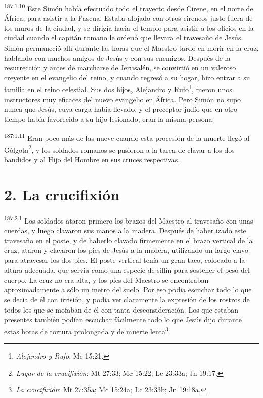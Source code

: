 \par 
\textsuperscript{187:1.10} Este Simón había efectuado todo el trayecto desde Cirene, en el norte de África, para asistir a la Pascua. Estaba alojado con otros cireneos justo fuera de los muros de la ciudad, y se dirigía hacia el templo para asistir a los oficios en la ciudad cuando el capitán romano le ordenó que llevara el travesaño de Jesús. Simón permaneció allí durante las horas que el Maestro tardó en morir en la cruz, hablando con muchos amigos de Jesús y con sus enemigos. Después de la resurrección y antes de marcharse de Jerusalén, se convirtió en un valeroso creyente en el evangelio del reino, y cuando regresó a su hogar, hizo entrar a su familia en el reino celestial. Sus dos hijos, Alejandro y Rufo\footnote{\textit{Alejandro y Rufo}: Mc 15:21.}, fueron unos instructores muy eficaces del nuevo evangelio en África. Pero Simón no supo nunca que Jesús, cuya carga había llevado, y el preceptor judío que en otro tiempo había favorecido a su hijo lesionado, eran la misma persona.

\par 
\textsuperscript{187:1.11} Eran poco más de las nueve cuando esta procesión de la muerte llegó al Gólgota\footnote{\textit{Lugar de la crucifixión}: Mt 27:33; Mc 15:22; Lc 23:33a; Jn 19:17.}, y los soldados romanos se pusieron a la tarea de clavar a los dos bandidos y al Hijo del Hombre en sus cruces respectivas.

\section*{2. La crucifixión}
\par 
\textsuperscript{187:2.1} Los soldados ataron primero los brazos del Maestro al travesaño con unas cuerdas, y luego clavaron sus manos a la madera. Después de haber izado este travesaño en el poste, y de haberlo clavado firmemente en el brazo vertical de la cruz, ataron y clavaron los pies de Jesús a la madera, utilizando un largo clavo para atravesar los dos pies. El poste vertical tenía un gran taco, colocado a la altura adecuada, que servía como una especie de sillín para sostener el peso del cuerpo. La cruz no era alta, y los pies del Maestro se encontraban aproximadamente a sólo un metro del suelo. Por eso podía escuchar todo lo que se decía de él con irrisión, y podía ver claramente la expresión de los rostros de todos los que se mofaban de él con tanta desconsideración. Los que estaban presentes también podían escuchar fácilmente todo lo que Jesús dijo durante estas horas de tortura prolongada y de muerte lenta\footnote{\textit{La crucifixión}: Mt 27:35a; Mc 15:24a; Lc 23:33b; Jn 19:18a.}.

